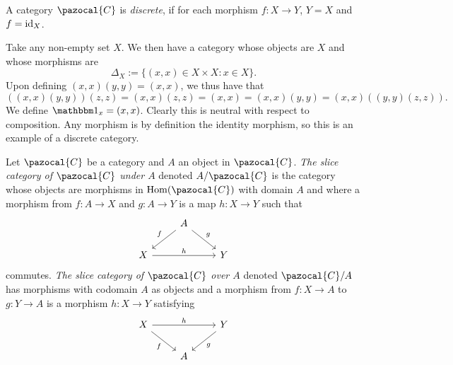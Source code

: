 \begin{definition}
    A category $\pazocal{C}$ is \emph{discrete}, if for each morphism $f:X\rightarrow Y$, $Y=X$ and $f=\mathrm{id}_X$.
\end{definition}
\begin{example}\label{SetIsDiscreteCategory}
    Take any non-empty set $X$. We then have a category whose objects are $X$ and whose morphisms are 
    $$\Delta_X := \{ (x,x) \in X\times X : x\in X\}.$$
    Upon defining $(x,x)(y,y)= (x,x)$, we thus have that 
    $$
        ((x,x)(y,y))(z,z)=(x,x)(z,z)= (x,x) = (x,x)(y,y)=(x,x)((y,y)(z,z)).
    $$
    We define $\fone_x = (x,x)$. Clearly this is neutral with respect to composition. Any morphism is by definition the identity morphism, so this is an example of a discrete category. 
\end{example}
\begin{definition}
    Let $\pazocal{C}$ be a category and $A$ an object in $\pazocal{C}$. \textit{The slice category of $\pazocal{C}$ under $A$} denoted $A/\pazocal{C}$ is the category whose objects are morphisms in $\Hom(\pazocal{C})$ with domain $A$ and where a morphism from $f: A \rightarrow X$ and $g : A \rightarrow Y $ is a map $h : X\rightarrow Y$ such that 
    $$\begin{tikzcd}
       & A \arrow[ld, "f"' ] \arrow[rd, "g"]\\
        X \arrow{rr}{h} & & Y
    \end{tikzcd}$$
    commutes. \textit{The slice category of $\pazocal{C}$ over $A$} denoted $\pazocal{C}/A$ has morphisms with codomain $A$ as objects and a morphism from $f : X \rightarrow A$ to $g : Y\rightarrow A$ is a morphism $h : X \rightarrow Y$ satisfying
    $$\begin{tikzcd}
        X \arrow[rd, "f"'] \arrow[rr, "h"] & & Y\arrow[ld, "g"]\\
        & A 
    \end{tikzcd}$$
\end{definition}
